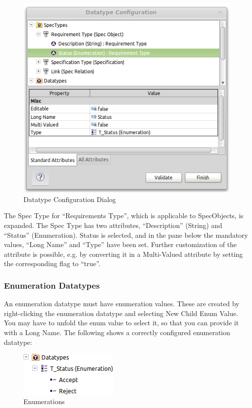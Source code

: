 {{{\begin{figure}[H]
\centering     
\includegraphics[width=0.8\linewidth]{../rmf-images/pror_datatype_configuration.png}
\caption{Datatype Configuration Dialog}      
\label{fig:DatatypeConfig}
\end{figure}

The Spec Type for ``Requirements Type'', which is applicable to
SpecObjects, is expanded.  The Spec Type has two attributes,
``Description'' (String) and ``Status'' (Enumeration).  Status is
selected, and in the pane below the mandatory values, ``Long Name'' and
``Type'' have been set.  Further customization of the attribute is
possible, e.g.  by converting it in a Multi-Valued attribute by setting
the corresponding flag to ``true''.

\subsubsection{Enumeration Datatypes}

An enumeration datatype must have enumeration values.  These are created
by right-clicking the enumeration datatype and selecting New Child
\textbar{} Enum Value.  You may have to unfold the enum value to select
it, so that you can provide it with a Long Name.  The following shows a
correctly configured enumeration datatype:

\begin{figure}[H]
\centering      
\includegraphics[width=0.4\linewidth]{../rmf-images/rmf_enumeration.png}
\caption{Enumerations}      
\label{fig:Enumerations}
\end{figure}

}}}
